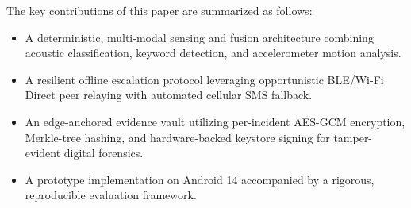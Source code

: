 \documentclass[conference]{IEEEtran}
\begin{document}
The key contributions of this paper are summarized as follows:
\begin{itemize}
    \item A deterministic, multi-modal sensing and fusion architecture combining acoustic classification, keyword detection, and accelerometer motion analysis.
    \item A resilient offline escalation protocol leveraging opportunistic BLE/Wi-Fi Direct peer relaying with automated cellular SMS fallback.
    \item An edge-anchored evidence vault utilizing per-incident AES-GCM encryption, Merkle-tree hashing, and hardware-backed keystore signing for tamper-evident digital forensics.
    \item A prototype implementation on Android 14 accompanied by a rigorous, reproducible evaluation framework.
\end{itemize}


\newcommand{\faMicrophone}{$\mathbf{\cdot}$\,\textbf{[Mic]}}
\newcommand{\faFileAlt}{$\mathbf{\cdot}$\,\textbf{[Txt]}}
\newcommand{\faCompressArrowsAlt}{$\mathbf{\cdot}$\,\textbf{[Mot]}}
\newcommand{\faProjectDiagram}{$\mathbf{\cdot}$\,\textbf{[Mesh]}}
\newcommand{\faBroadcastTower}{$\mathbf{\cdot}$\,\textbf{[SMS]}}
\newcommand{\faUsers}{$\mathbf{\cdot}$\,\textbf{[Users]}}
\newcommand{\faMobileAlt}{$\mathbf{\cdot}$\,\textbf{[Peer]}}
\newcommand{\faUserShield}{$\mathbf{\cdot}$\,\textbf{[Help]}}
\newcommand{\faCamera}{$\mathbf{\cdot}$\,\textbf{[Cam]}}
\newcommand{\faLock}{$\mathbf{\cdot}$\,\textbf{[Lock]}}
\newcommand{\faFileContract}{$\mathbf{\cdot}$\,\textbf{[Sign]}}
\newcommand{\faDatabase}{$\mathbf{\cdot}$\,\textbf{[DB]}}
\newcommand{\faListUl}{$\mathbf{\cdot}$\,\textbf{[Sum]}}
\newcommand{\faFileInvoice}{$\mathbf{\cdot}$\,\textbf{[FIR]}}
\newcommand{\faBalanceScale}{$\mathbf{\cdot}$\,\textbf{[Law]}}
\end{document}
